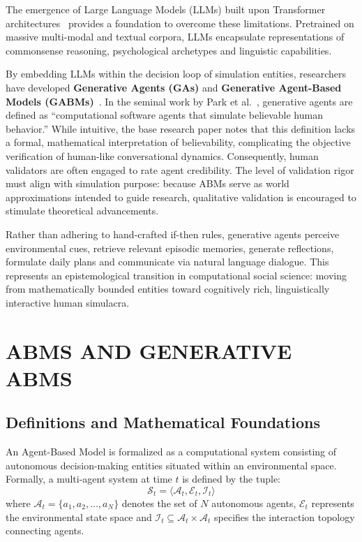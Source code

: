 \documentclass[12pt,a4paper]{report}
\begin{document}
The emergence of Large Language Models (LLMs) built upon Transformer architectures~\cite{vaswani2017attention} provides a foundation to overcome these limitations. Pretrained on massive multi-modal and textual corpora, LLMs encapsulate representations of commonsense reasoning, psychological archetypes and linguistic capabilities.

By embedding LLMs within the decision loop of simulation entities, researchers have developed \textbf{Generative Agents (GAs)} and \textbf{Generative Agent-Based Models (GABMs)}~\cite{adornetto2025generative}. In the seminal work by Park et al.~\cite{park2023generative}, generative agents are defined as ``computational software agents that simulate believable human behavior.'' While intuitive, the base research paper notes that this definition lacks a formal, mathematical interpretation of believability, complicating the objective verification of human-like conversational dynamics. Consequently, human validators are often engaged to rate agent credibility. The level of validation rigor must align with simulation purpose: because ABMs serve as world approximations intended to guide research, qualitative validation is encouraged to stimulate theoretical advancements.

Rather than adhering to hand-crafted if-then rules, generative agents perceive environmental cues, retrieve relevant episodic memories, generate reflections, formulate daily plans and communicate via natural language dialogue. This represents an epistemological transition in computational social science: moving from mathematically bounded entities toward cognitively rich, linguistically interactive human simulacra.

\chapter{ABMS AND GENERATIVE ABMS}
\label{chap:abms_and_gabms}

\section{Definitions and Mathematical Foundations}
\label{sec:math_foundations}

An Agent-Based Model is formalized as a computational system consisting of autonomous decision-making entities situated within an environmental space. Formally, a multi-agent system at time $t$ is defined by the tuple:
\begin{equation}
\mathcal{S}_t = \langle \mathcal{A}_t, \mathcal{E}_t, \mathcal{I}_t \rangle
\end{equation}
where $\mathcal{A}_t = \{a_1, a_2, \dots, a_N\}$ denotes the set of $N$ autonomous agents, $\mathcal{E}_t$ represents the environmental state space and $\mathcal{I}_t \subseteq \mathcal{A}_t \times \mathcal{A}_t$ specifies the interaction topology connecting agents.
\end{document}
